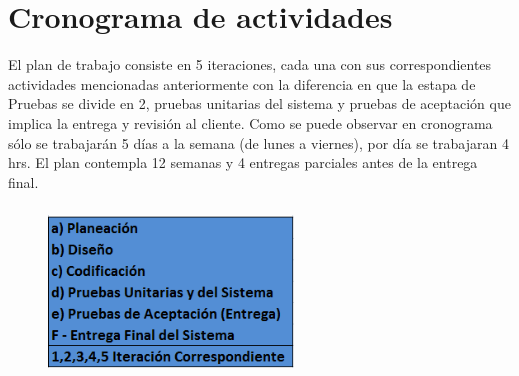 \section{Cronograma de actividades}
El plan de trabajo consiste en 5 iteraciones, cada una con sus correspondientes actividades mencionadas anteriormente con la diferencia en que la estapa de Pruebas se divide en 2, pruebas unitarias del sistema y pruebas de aceptación que implica la entrega y revisión al cliente. Como se puede observar en cronograma sólo se trabajarán 5 días a la semana (de lunes  a viernes), por día se trabajaran 4 hrs. El plan contempla 12 semanas y 4 entregas parciales antes de la entrega final.
\begin{figure}[h!]
	\includegraphics[width=6.5cm, height=4.5cm]{xp1.png}
	
\end{figure}
